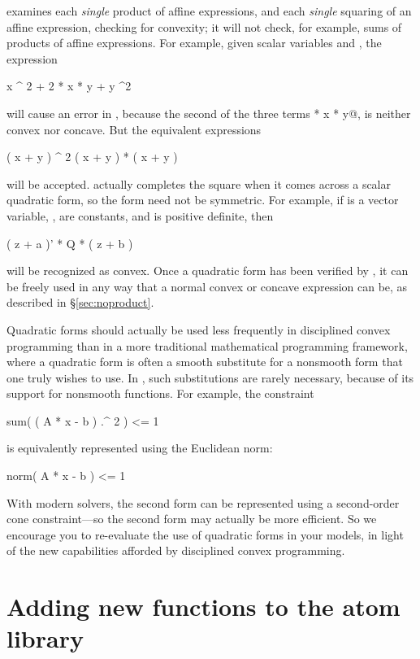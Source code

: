 \documentclass[12pt]{article}
\begin{document}
\cvx examines each \emph{single} product of affine expressions, and each
\emph{single} squaring of an affine expression, checking for 
convexity; it will not check, for example, sums of products of 
affine expressions.
For example, given scalar variables \verb@x@ and \verb@y@,
the expression
\begin{code}
	x ^ 2 + 2 * x * y + y ^2
\end{code}
will cause an error in \cvx, because the second of the three terms
 * x * y@, is neither convex nor concave.
But the equivalent expressions
\begin{code}
	( x + y ) ^ 2
	( x + y ) * ( x + y )
\end{code}
will be accepted. \cvx actually completes the
square when it comes across a scalar quadratic form, so the form
need not be symmetric. For example,
if \verb@z@ is a vector variable, \verb@a@, \verb@b@ are constants,
and \verb@Q@ is positive definite, then
\begin{code}
	( z + a )' * Q * ( z + b )
\end{code}
will be recognized as convex. Once a quadratic form has been verified by \cvx,
it can be freely
used in any way that a normal convex or concave expression can be,
as described in \S\ref{sec:noproduct}.

Quadratic forms should actually be used less
frequently in disciplined convex programming
than in a more traditional mathematical programming framework,
where a quadratic form is often a smooth substitute 
for a nonsmooth form that one truly wishes to use. In
\cvx, such substitutions are rarely necessary, because of its support
for nonsmooth functions. For example,
the constraint
\begin{code}
	sum( ( A * x - b ) .^ 2 ) <= 1
\end{code}
is equivalently represented using the Euclidean norm:
\begin{code}
	norm( A * x - b ) <= 1
\end{code}
With modern solvers, the second form can be represented using a second-order cone
constraint---so the second form may actually be more efficient. So we encourage
you to re-evaluate the use of quadratic forms in your models, in light of the
new capabilities afforded by disciplined convex programming.


\newpage
\section{Adding new functions to the \cvx atom library}
\label{s-new-fcts}
\end{document}
